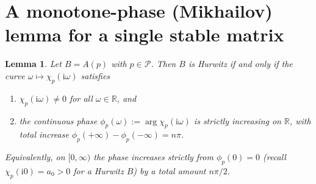 \documentclass[12pt]{article}
\newtheorem{lemma}{Lemma}
\theoremstyle{definition}
\newcommand{\jj}{\mathrm{i}}
\begin{document}
\section{A monotone-phase (Mikhailov) lemma for a single stable matrix}

\begin{lemma}\label{lem:mik}
Let $B=A(p)$ with $p\in\mathcal P$. Then $B$ is Hurwitz if and only if the curve
$\omega\mapsto\chi_p(\jj\omega)$ satisfies
\begin{enumerate}
\item[(M1)] $\chi_p(\jj\omega)\ne0$ for all $\omega\in\mathbb R$, and
\item[(M2)] the continuous phase $\phi_p(\omega):=\arg\chi_p(\jj\omega)$ is strictly
increasing on $\mathbb R$, with total increase $\phi_p(+\infty)-\phi_p(-\infty)=n\pi$.
\end{enumerate}
Equivalently, on $[0,\infty)$ the phase increases strictly from $\phi_p(0)=0$ (recall
$\chi_p(\jj 0)=a_0>0$ for a Hurwitz $B$) by a total amount $n\pi/2$.
\end{lemma}
\end{document}
